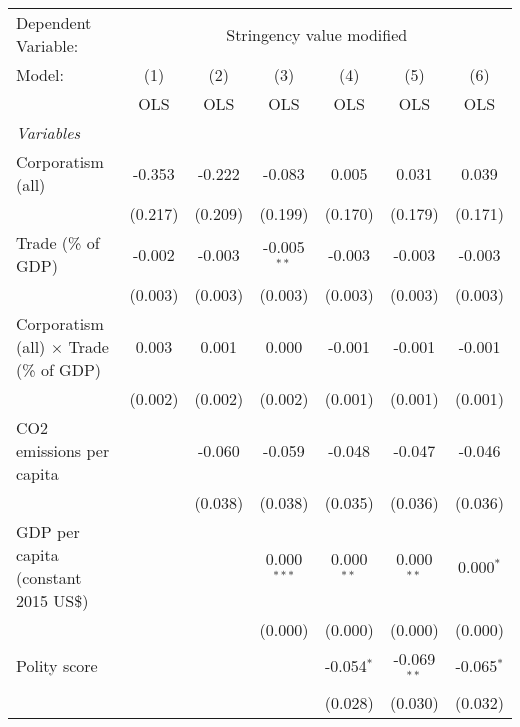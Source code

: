 
\begingroup
\centering
\begin{tabular}{lcccccc}
   \toprule
   Dependent Variable: & \multicolumn{6}{c}{Stringency value modified}\\
   Model:                                         & (1)     & (2)     & (3)           & (4)          & (5)           & (6)\\  
                                                  &  OLS    & OLS     & OLS           & OLS          & OLS           & OLS\\  
   \midrule
   \emph{Variables}\\
   Corporatism (all)                              & -0.353  & -0.222  & -0.083        & 0.005        & 0.031         & 0.039\\   
                                                  & (0.217) & (0.209) & (0.199)       & (0.170)      & (0.179)       & (0.171)\\   
   Trade (\% of GDP)                              & -0.002  & -0.003  & -0.005$^{**}$ & -0.003       & -0.003        & -0.003\\   
                                                  & (0.003) & (0.003) & (0.003)       & (0.003)      & (0.003)       & (0.003)\\   
   Corporatism (all) $\times$ Trade (\% of GDP)   & 0.003   & 0.001   & 0.000         & -0.001       & -0.001        & -0.001\\   
                                                  & (0.002) & (0.002) & (0.002)       & (0.001)      & (0.001)       & (0.001)\\   
   CO2 emissions per capita                       &         & -0.060  & -0.059        & -0.048       & -0.047        & -0.046\\   
                                                  &         & (0.038) & (0.038)       & (0.035)      & (0.036)       & (0.036)\\   
   GDP per capita (constant 2015 US\$)            &         &         & 0.000$^{***}$ & 0.000$^{**}$ & 0.000$^{**}$  & 0.000$^{*}$\\   
                                                  &         &         & (0.000)       & (0.000)      & (0.000)       & (0.000)\\   
   Polity score                                   &         &         &               & -0.054$^{*}$ & -0.069$^{**}$ & -0.065$^{*}$\\   
                                                  &         &         &               & (0.028)      & (0.030)       & (0.032)\\   

\end{tabular}
